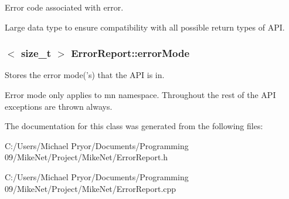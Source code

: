 Error code associated with error. 

Large data type to ensure compatibility with all possible return types of API. \hypertarget{class_error_report_ab43384b89b5e0b6addcde53268d3c578}{
\subsubsection[{errorMode}]{$<$ size\_\-t $>$ {\bf ErrorReport::errorMode}}}
\label{class_error_report_ab43384b89b5e0b6addcde53268d3c578}


Stores the error mode('s) that the API is in. 

Error mode only applies to mn namespace. Throughout the rest of the API exceptions are thrown always. 

The documentation for this class was generated from the following files:\begin{DoxyCompactItemize}
\item 
C:/Users/Michael Pryor/Documents/Programming 09/MikeNet/Project/MikeNet/ErrorReport.h\item 
C:/Users/Michael Pryor/Documents/Programming 09/MikeNet/Project/MikeNet/ErrorReport.cpp\end{DoxyCompactItemize}
